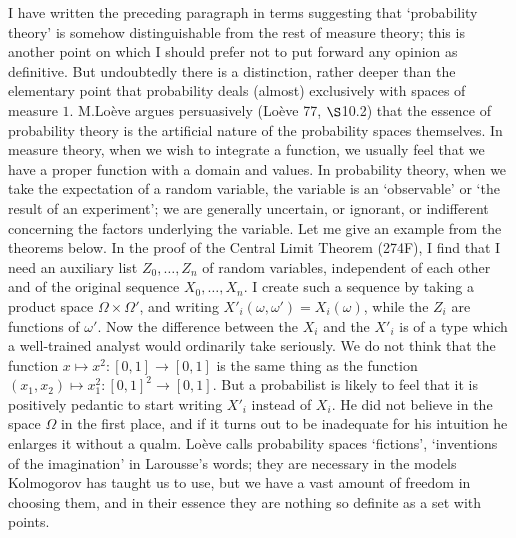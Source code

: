 I have written the preceding paragraph in terms suggesting that  
`probability theory' is somehow distinguishable from the rest of measure 
theory;  this is another point on which I should prefer not to put 
forward any opinion as definitive.   But undoubtedly there is a 
distinction, rather deeper than the elementary point that probability 
deals (almost) exclusively with spaces of measure $1$. 
M.Lo\`eve argues persuasively ({\smc Lo\`eve 77}, $\S$10.2) 
that the essence of 
probability theory is the artificial nature of the probability spaces 
themselves.   In measure theory, when we wish to integrate a function, 
we usually feel that we have a proper function with a domain and 
values.   In probability theory, when we take the expectation of a 
random variable, the variable is an `observable' or `the result 
of an experiment';  we are generally uncertain, or ignorant, or 
indifferent concerning the factors underlying the variable.   Let me 
give an example from the theorems below.   In the proof of the Central 
Limit Theorem (274F), I find that I need an auxiliary list 
$Z_0,\ldots,Z_n$ of random variables, independent of each other and of 
the original sequence $X_0,\ldots,X_n$.   I create such a sequence by 
taking a product space $\Omega\times\Omega'$, and writing 
$X'_i(\omega,\omega')=X_i(\omega)$, while the $Z_i$ are functions of 
$\omega'$.   Now the difference between the $X_i$ and the $X'_i$ is of a 
type which a well-trained analyst would ordinarily take seriously.   We 
do not think that the function $x\mapsto x^2:[0,1]\to[0,1]$ is the 
same thing as the function $(x_1,x_2)\mapsto x_1^2:[0,1]^2\to[0,1]$.   But a 
probabilist is likely to feel that it is positively pedantic to start 
writing $X'_i$ instead of $X_i$.   He did not believe in the space 
$\Omega$ in the first place, and if it turns out to be inadequate for 
his intuition he enlarges it without a qualm.   Lo\`eve calls 
probability 
spaces `fictions', `inventions of the imagination' in Larousse's 
words;  they are necessary in the models Kolmogorov has taught us 
to use, but we have a vast amount of freedom in choosing them, and in 
their essence they are nothing so definite as a set with points. 
 
